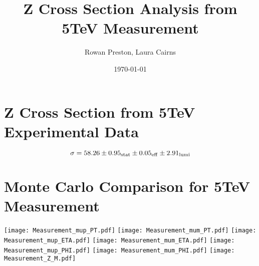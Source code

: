 \documentclass[a4paper]{article}
\title{Z Cross Section Analysis from 5TeV Measurement}
\author{Rowan Preston, Laura Cairns}
\date{\today}
\begin{document}
\maketitle

\section{Z Cross Section from 5TeV Experimental Data}
\begin{equation}
\sigma = 58.26 \pm 0.95_{\rm stat} \pm 0.05_{\rm eff} \pm 2.91_{\rm lumi}
\end{equation}

\section{Monte Carlo Comparison for 5TeV Measurement}

\texttt{[image: Measurement\_mup\_PT.pdf]}
\texttt{[image: Measurement\_mum\_PT.pdf]}
\texttt{[image: Measurement\_mup\_ETA.pdf]}
\texttt{[image: Measurement\_mum\_ETA.pdf]}
\texttt{[image: Measurement\_mup\_PHI.pdf]}
\texttt{[image: Measurement\_mum\_PHI.pdf]}
\texttt{[image: Measurement\_Z\_M.pdf]}



{}

\end{document}
